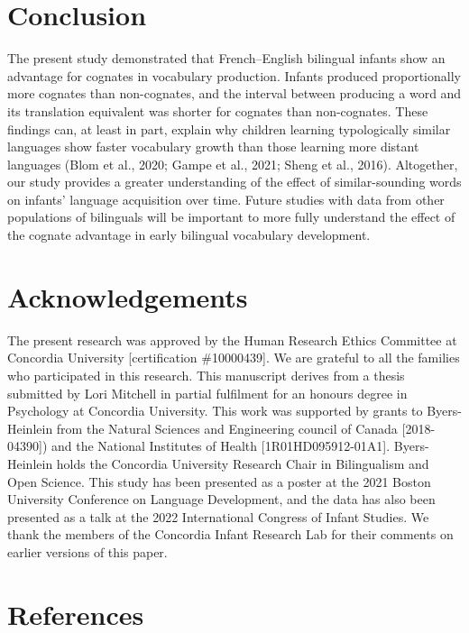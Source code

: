 \documentclass[
  ,man,floatsintext]{apa6}
\begin{document}
\hypertarget{conclusion}{%
\section{Conclusion}\label{conclusion}}

The present study demonstrated that French--English bilingual infants show an advantage for cognates in vocabulary production. Infants produced proportionally more cognates than non-cognates, and the interval between producing a word and its translation equivalent was shorter for cognates than non-cognates. These findings can, at least in part, explain why children learning typologically similar languages show faster vocabulary growth than those learning more distant languages (Blom et al., 2020; Gampe et al., 2021; Sheng et al., 2016). Altogether, our study provides a greater understanding of the effect of similar-sounding words on infants' language acquisition over time. Future studies with data from other populations of bilinguals will be important to more fully understand the effect of the cognate advantage in early bilingual vocabulary development.

\newpage

\hypertarget{acknowledgements}{%
\section{Acknowledgements}\label{acknowledgements}}

\noindent The present research was approved by the Human Research Ethics Committee at Concordia University {[}certification \#10000439{]}. We are grateful to all the families who participated in this research. This manuscript derives from a thesis submitted by Lori Mitchell in partial fulfilment for an honours degree in Psychology at Concordia University. This work was supported by grants to Byers-Heinlein from the Natural Sciences and Engineering council of Canada {[}2018-04390{]}) and the National Institutes of Health {[}1R01HD095912-01A1{]}. Byers-Heinlein holds the Concordia University Research Chair in Bilingualism and Open Science. This study has been presented as a poster at the 2021 Boston University Conference on Language Development, and the data has also been presented as a talk at the 2022 International Congress of Infant Studies. We thank the members of the Concordia Infant Research Lab for their comments on earlier versions of this paper.

\newpage

\hypertarget{references}{%
\section{References}\label{references}}
\end{document}
